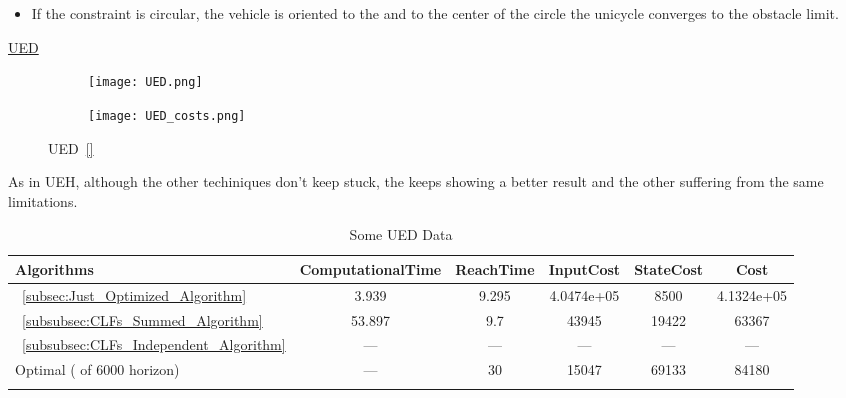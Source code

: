 \begin{tcolorbox}[colback=blue!5!white,colframe=blue!35!white,title=Notes:]
\begin{itemize}
    \item If the constraint is circular, the vehicle is oriented to the \txtref and to the center of the circle the unicycle converges to the obstacle limit.
  \end{itemize}
\end{tcolorbox} 

\newpage %

\underline{UED}
\label{UED} %

 \begin{figure}[htbp]
  \begin{subfigure}{0.6\textwidth}
    \centering
    \texttt{[image: UED.png]}
  \label{fig:UED_CostEvol}
  \end{subfigure}
  \begin{subfigure}{0.59\textwidth}
    \centering
    \texttt{[image: UED\_costs.png]}
  \label{fig:UED_trajectory}
  \end{subfigure}
  \caption{UED~\ref{}}
\label{fig:UEDTrajectory_and_CostEvol}
\end{figure}


As in UEH, although the other techiniques don't keep stuck, the  keeps showing a better result and the other suffering from the same limitations.


\bgroup
 \begin{xltabular}{\textwidth}{|l|ccccc|}
   \toprule
   Algorithms   & ComputationalTime  & ReachTime  & InputCost   & StateCost & Cost           \\
   \midrule
    ~\ref{subsec:Just_Optimized_Algorithm}           & 3.939  & 9.295  & 4.0474e+05 & 8500 & 4.1324e+05 \\
    ~\ref{subsubsec:CLFs_Summed_Algorithm}        & 53.897 & 9.7     & 43945 & 19422 & 63367 \\
    ~\ref{subsubsec:CLFs_Independent_Algorithm}   & ---   & ---      & ---  & ---  & ---  \\
    Optimal ( of 6000 horizon)                        & ---    & 30 & 15047  & 69133 & 84180 \\
    \midrule
    \caption{Some UED Data}
   \label{tab:Some_UED_Data}\\
   \end{xltabular}
 \egroup


